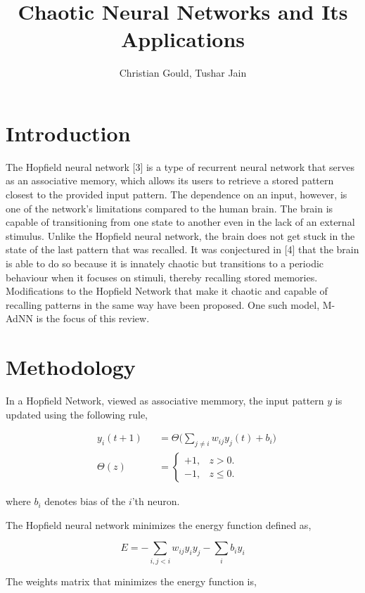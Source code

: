 \documentclass[12pt, letterpaper]{article}
\title{Chaotic Neural Networks and Its Applications}
\author{Christian Gould, Tushar Jain}
\date{}
\begin{document}
\maketitle

\section*{Introduction}

The Hopfield neural network [3] is a type of recurrent neural network that serves as an associative memory, which allows its users to retrieve a stored pattern closest to the provided input pattern. The dependence on an input, however, is one of the network's limitations compared to the human brain. The brain is capable of transitioning from one state to another even in the lack of an external stimulus. Unlike the Hopfield neural network, the brain does not get stuck in the state of the last pattern that was recalled. It was conjectured in [4] that the brain is able to do so because it is innately chaotic but transitions to a periodic behaviour when it focuses on stimuli, thereby recalling stored memories. Modifications to the Hopfield Network that make it chaotic and capable of recalling patterns in the same way have been proposed. One such model, M-AdNN is the focus of this review.

\section*{Methodology}

In a Hopfield Network, viewed as associative memmory, the input pattern $y$ is updated using the following rule,

$$
\begin{aligned}
& y_i(t+1) &&= \Theta\big(\sum_{j \neq i} w_{ij}y_j(t) + b_i \big)\\
& \Theta(z) &&= \begin{cases}
  +1, & z > 0.\\
  -1, & z \le 0.
  \end{cases}
\end{aligned}
$$

where $b_i$ denotes bias of the $i$'th neuron.

The Hopfield neural network minimizes the energy function defined as,

$$
E = -\sum_{i,j < i} w_{ij}y_i y_j - \sum_{i} b_i y_i
$$

The weights matrix that minimizes the energy function is,
\end{document}
